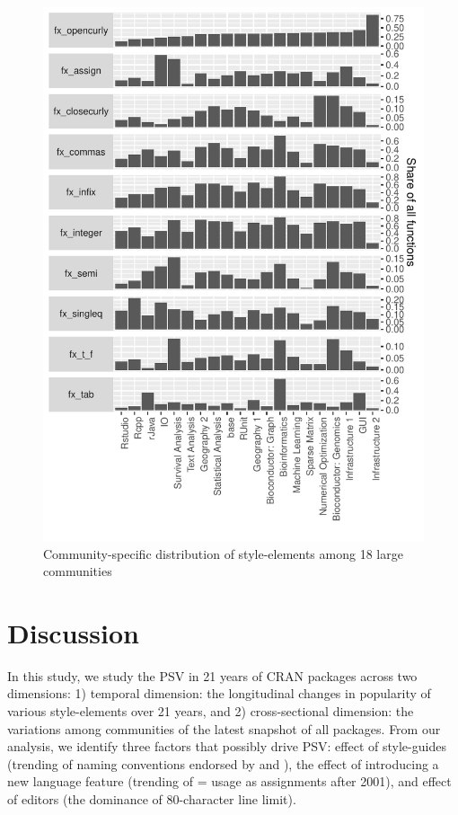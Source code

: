 \begin{figure}[htbp]
  \centering
  \includegraphics{fig5}
  \caption{Community-specific distribution of style-elements among 18 large communities}
  \label{figure:fig5}
\end{figure}

\section{Discussion}

In this study, we study the PSV in 21 years of CRAN packages across two dimensions: 1) temporal dimension: the longitudinal changes in popularity of various style-elements over 21 years, and 2) cross-sectional dimension: the variations among communities of the latest snapshot of all packages. From our analysis, we identify three factors that possibly drive PSV: effect of style-guides (trending of naming conventions endorsed by \citet{tidyverse} and \citet{google}), the effect of introducing a new language feature (trending of = usage as assignments after 2001), and effect of editors (the dominance of 80-character line limit).

